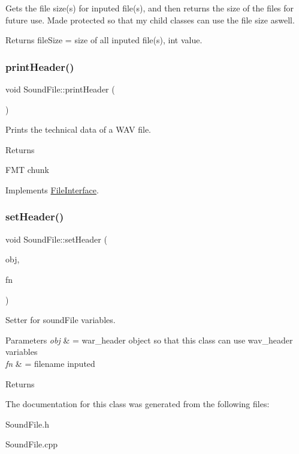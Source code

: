 Gets the file size(s) for inputed file(s), and then returns the size of the files for future use. Made protected so that my child classes can use the file size aswell. \begin{DoxyReturn}{Returns}
file\+Size = size of all inputed file(s), int value. 
\end{DoxyReturn}
\mbox{\label{classSoundFile_a44b17fb295a9918410c7ec4242370ef9}} 
\subsubsection{\texorpdfstring{print\+Header()}{printHeader()}}
{\footnotesize\ttfamily void Sound\+File\+::print\+Header (\begin{DoxyParamCaption}{ }\end{DoxyParamCaption})\hspace{0.3cm}{\ttfamily [virtual]}}

Prints the technical data of a W\+AV file. \begin{DoxyReturn}{Returns}

\end{DoxyReturn}
F\+MT chunk 

Implements \hyperlink{classFileInterface}{File\+Interface}.

\mbox{\label{classSoundFile_ab867a2098653a80f9eb89d39b4ad3f03}} 
\subsubsection{\texorpdfstring{set\+Header()}{setHeader()}}
{\footnotesize\ttfamily void Sound\+File\+::set\+Header (\begin{DoxyParamCaption}\item[{\hyperlink{structWAV__HEADER}{W\+A\+V\+\_\+\+H\+E\+A\+D\+ER} $\ast$}]{obj,  }\item[{string}]{fn }\end{DoxyParamCaption})}

Setter for sound\+File variables. 
\begin{DoxyParams}{Parameters}
{\em obj} & = war\+\_\+header object so that this class can use wav\+\_\+header variables \\
\hline
{\em fn} & = filename inputed \\
\hline
\end{DoxyParams}
\begin{DoxyReturn}{Returns}

\end{DoxyReturn}


The documentation for this class was generated from the following files\+:\begin{DoxyCompactItemize}
\item 
Sound\+File.\+h\item 
Sound\+File.\+cpp\end{DoxyCompactItemize}
